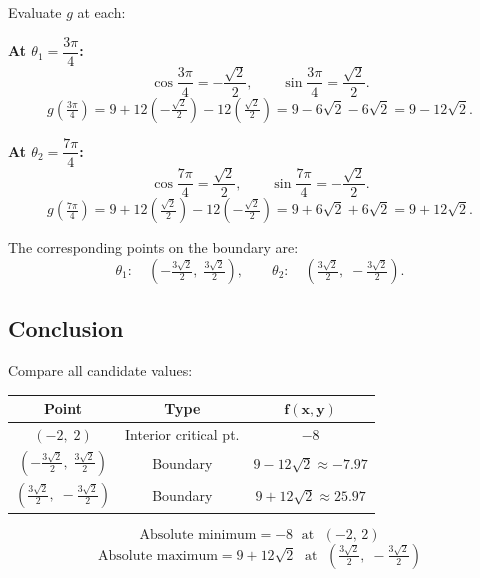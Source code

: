 \documentclass[12pt]{article}
\begin{document}
Evaluate $g$ at each:

\medskip
\noindent\textbf{At $\theta_1 = \dfrac{3\pi}{4}$:}
\[
  \cos\frac{3\pi}{4} = -\frac{\sqrt{2}}{2}, \qquad
  \sin\frac{3\pi}{4} = \frac{\sqrt{2}}{2}.
\]
\[
  g\!\left(\tfrac{3\pi}{4}\right)
    = 9 + 12\!\left(-\tfrac{\sqrt{2}}{2}\right) - 12\!\left(\tfrac{\sqrt{2}}{2}\right)
    = 9 - 6\sqrt{2} - 6\sqrt{2}
    = 9 - 12\sqrt{2}.
\]

\noindent\textbf{At $\theta_2 = \dfrac{7\pi}{4}$:}
\[
  \cos\frac{7\pi}{4} = \frac{\sqrt{2}}{2}, \qquad
  \sin\frac{7\pi}{4} = -\frac{\sqrt{2}}{2}.
\]
\[
  g\!\left(\tfrac{7\pi}{4}\right)
    = 9 + 12\!\left(\tfrac{\sqrt{2}}{2}\right) - 12\!\left(-\tfrac{\sqrt{2}}{2}\right)
    = 9 + 6\sqrt{2} + 6\sqrt{2}
    = 9 + 12\sqrt{2}.
\]

The corresponding points on the boundary are:
\[
  \theta_1:\quad \left(-\tfrac{3\sqrt{2}}{2},\;\tfrac{3\sqrt{2}}{2}\right),
  \qquad
  \theta_2:\quad \left(\tfrac{3\sqrt{2}}{2},\;-\tfrac{3\sqrt{2}}{2}\right).
\]

\subsection*{Conclusion}

Compare all candidate values:

\medskip
\begin{center}
\renewcommand{\arraystretch}{1.4}
\begin{tabular}{|c|c|c|}
\hline
\textbf{Point} & \textbf{Type} & $\boldsymbol{f(x,y)}$ \\
\hline
$(-2,\;2)$ & Interior critical pt. & $-8$ \\
\hline
$\left(-\frac{3\sqrt{2}}{2},\;\frac{3\sqrt{2}}{2}\right)$
  & Boundary & $9 - 12\sqrt{2} \approx -7.97$ \\
\hline
$\left(\frac{3\sqrt{2}}{2},\;-\frac{3\sqrt{2}}{2}\right)$
  & Boundary & $9 + 12\sqrt{2} \approx 25.97$ \\
\hline
\end{tabular}
\end{center}

\bigskip
\[
  \boxed{\text{Absolute minimum} = -8
    \;\text{ at }\; (-2,\,2)}
\]
\[
  \boxed{\text{Absolute maximum} = 9 + 12\sqrt{2}
    \;\text{ at }\;
    \left(\tfrac{3\sqrt{2}}{2},\;-\tfrac{3\sqrt{2}}{2}\right)}
\]

\newpage
\end{document}
